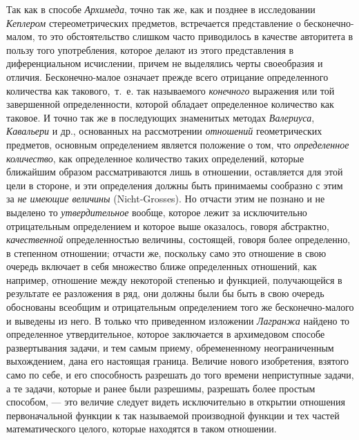{Так как в способе {\em Архимеда}, точно так же, как и
позднее в исследовании {\em Кеплером} стереометрических
предметов, встречается представление о бесконечно-малом, то это
обстоятельство слишком часто приводилось в качестве авторитета в пользу
того употребления, которое делают из этого представления в диференциальном
исчислении, причем не выделялись черты своеобразия и отличия.
Бесконечно-малое означает прежде всего отрицание определенного количества
как такового,~т.~е. так называемого {\em конечного}
выражения или той завершенной определенности, которой обладает определенное
количество как таковое. И точно так же в последующих знаменитых методах
{\em Валериуса}, {\em Кавальери} и
др., основанных на рассмотрении {\em отношений}
геометрических предметов, основным определением является положение о том,
что {\em определенное количество}, как определенное
количество таких определений, которые ближайшим образом рассматриваются
лишь в отношении, оставляется для этой цели в стороне, и эти определения
должны быть принимаемы сообразно с этим за {\em не
имеющие величины} (Nicht-Grosses). Но отчасти этим не познано и не выделено
то {\em утвердительное} вообще, которое лежит за
исключительно отрицательным определением и которое выше оказалось, говоря
абстрактно, {\em качественной} определенностью
величины, состоящей, говоря более определенно, в степенном отношении;
отчасти же, поскольку само это отношение в свою очередь включает в себя
множество ближе определенных отношений, как например, отношение между
некоторой степенью и функцией, получающейся в результате ее разложения в
ряд, они должны были бы быть в свою очередь обоснованы всеобщим и
отрицательным определением того же бесконечно-малого и выведены из него. В
только что приведенном изложении {\em Лагранжа} найдено
то определенное утвердительное, которое заключается в архимедовом способе
развертывания задачи, и тем самым приему, обремененному неограниченным
выхождением, дана его настоящая граница. Величие нового изобретения,
взятого само по себе, и его способность разрешать до того времени
неприступные задачи, а те задачи, которые и ранее были разрешимы, разрешать
более простым способом, — это величие следует видеть исключительно в
открытии отношения первоначальной функции к так называемой производной
функции и тех частей математического целого, которые находятся в таком
отношении.

}

